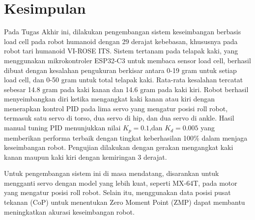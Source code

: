 \section{Kesimpulan}
\label{sec:kesimpulan}

Pada Tugas Akhir ini, dilakukan pengembangan sistem keseimbangan berbasis load cell pada robot humanoid dengan 29 derajat kebebasan, khususnya pada robot tari humanoid VI-ROSE ITS. Sistem tertanam pada telapak kaki, yang menggunakan mikrokontroler ESP32-C3 untuk membaca sensor load cell, berhasil dibuat dengan kesalahan pengukuran berkisar antara 0-19 gram untuk setiap load cell, dan 0-50 gram untuk total telapak kaki. Rata-rata kesalahan tercatat sebesar 14.8 gram pada kaki kanan dan 14.6 gram pada kaki kiri. Robot berhasil menyeimbangkan diri ketika mengangkat kaki kanan atau kiri dengan menerapkan kontrol PID pada lima servo yang mengatur posisi roll robot, termasuk satu servo di torso, dua servo di hip, dan dua servo di ankle. Hasil manual tuning PID menunjukkan nilai $K_p=0.1$,dan $K_d =0.005$ yang memberikan performa terbaik dengan tingkat keberhasilan 100\% dalam menjaga keseimbangan robot. Pengujian dilakukan dengan gerakan mengangkat kaki kanan maupun kaki kiri dengan kemiringan 3 derajat.

Untuk pengembangan sistem ini di masa mendatang, disarankan untuk mengganti servo dengan model yang lebih kuat, seperti MX-64T, pada motor yang mengatur posisi roll robot. Selain itu, menggunakan data posisi pusat tekanan (CoP) untuk menentukan Zero Moment Point (ZMP) dapat membantu meningkatkan akurasi keseimbangan robot.
